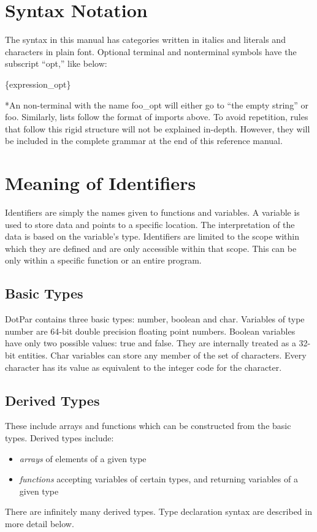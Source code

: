 \section{Syntax Notation}
The syntax in this manual has categories written in italics and literals and characters in
plain font. Optional terminal and nonterminal symbols have the subscript ``opt,'' like below:

\centerline{\{expression\_opt\}}

*An non-terminal with the name foo\_opt will either go to ``the empty string'' or foo. Similarly, lists follow the format of imports above. To avoid repetition, rules that follow this rigid structure will not be explained in-depth. However, they will be included in the complete grammar at the end of this reference manual.
\section{Meaning of Identifiers}
Identifiers are simply the names given to functions and variables. A variable is used to store data and points to a specific location. The interpretation of the data is based on the variable's type. Identifiers are limited to the scope within which they are defined and are only accessible within that scope. This can be only within a specific function or an entire program.
\subsection{Basic Types}
DotPar contains three basic types: number, boolean and char. Variables of type number are 64-bit double precision floating point numbers. Boolean variables have only two possible values: true and false. They are internally treated as a 32-bit entities. Char variables can store any member of the set of characters. Every character has its value as equivalent to the integer code for the character.
\subsection{Derived Types}
These include arrays and functions which can be constructed from the basic types. Derived types include:
\begin{itemize}
\item
\emph{arrays} of elements of a given type
\item
\emph{functions} accepting variables of certain types, and returning variables of a given type
\end{itemize}
There are infinitely many derived types. Type declaration syntax are described in more detail below.

